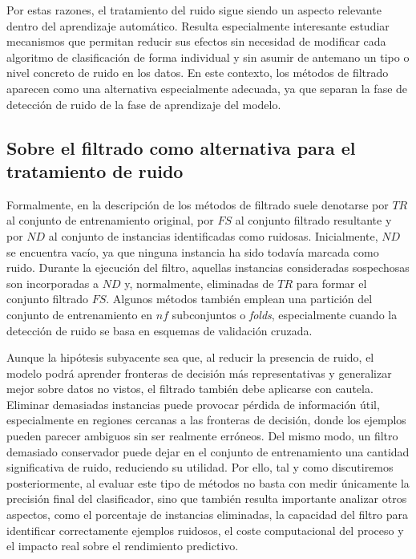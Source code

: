 \documentclass[print, color]{ugrTFG}
\begin{document}
 Por estas razones, el tratamiento del ruido sigue siendo un aspecto relevante dentro del aprendizaje automático. Resulta especialmente interesante estudiar mecanismos que permitan reducir sus efectos sin necesidad de modificar cada algoritmo de clasificación de forma individual y sin asumir de antemano un tipo o nivel concreto de ruido en los datos. En este contexto, los métodos de filtrado aparecen como una alternativa especialmente adecuada, ya que separan la fase de detección de ruido de la fase de aprendizaje del modelo.

 \subsection{Sobre el filtrado como alternativa para el tratamiento de ruido}

 Formalmente, en la descripción de los métodos de filtrado suele denotarse por $TR$ al conjunto de entrenamiento original, por $FS$ al conjunto filtrado resultante y por $ND$ al conjunto de instancias identificadas como ruidosas. Inicialmente, $ND$ se encuentra vacío, ya que ninguna instancia ha sido todavía marcada como ruido. Durante la ejecución del filtro, aquellas instancias consideradas sospechosas son incorporadas a $ND$ y, normalmente, eliminadas de $TR$ para formar el conjunto filtrado $FS$. Algunos métodos también emplean una partición del conjunto de entrenamiento en $nf$ subconjuntos o \textit{folds}, especialmente cuando la detección de ruido se basa en esquemas de validación cruzada.

 Aunque la hipótesis subyacente sea que, al reducir la presencia de ruido, el modelo podrá aprender fronteras de decisión más representativas y generalizar mejor sobre datos no vistos, el filtrado también debe aplicarse con cautela. Eliminar demasiadas instancias puede provocar pérdida de información útil, especialmente en regiones cercanas a las fronteras de decisión, donde los ejemplos pueden parecer ambiguos sin ser realmente erróneos. Del mismo modo, un filtro demasiado conservador puede dejar en el conjunto de entrenamiento una cantidad significativa de ruido, reduciendo su utilidad. Por ello, tal y como discutiremos posteriormente, al evaluar este tipo de métodos no basta con medir únicamente la precisión final del clasificador, sino que también resulta importante analizar otros aspectos, como el porcentaje de instancias eliminadas, la capacidad del filtro para identificar correctamente ejemplos ruidosos, el coste computacional del proceso y el impacto real sobre el rendimiento predictivo.
\end{document}
